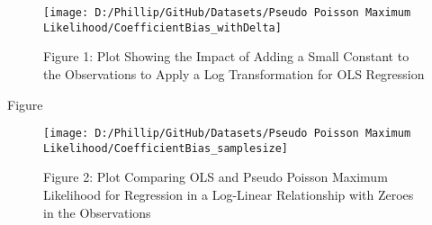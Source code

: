 \documentclass[
]{article}
\begin{document}
\begin{figure}

{\centering \texttt{[image: D:/Phillip/GitHub/Datasets/Pseudo Poisson Maximum Likelihood/CoefficientBias\_withDelta]} 

}

\caption{Figure 1: Plot Showing the Impact of Adding a Small Constant to the Observations to Apply a Log Transformation for OLS Regression}\label{fig:unnamed-chunk-1}
\end{figure}

Figure

\begin{figure}

{\centering \texttt{[image: D:/Phillip/GitHub/Datasets/Pseudo Poisson Maximum Likelihood/CoefficientBias\_samplesize]} 

}

\caption{Figure 2: Plot Comparing OLS and Pseudo Poisson Maximum Likelihood for Regression in a Log-Linear Relationship with Zeroes in the Observations}\label{fig:unnamed-chunk-2}
\end{figure}
\end{document}
